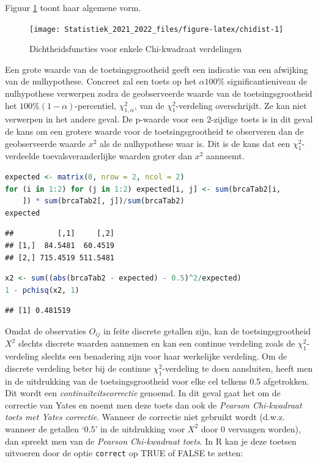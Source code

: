 \documentclass[
  12pt,dutch,coursenotes]{book}
\theoremstyle{definition}
\theoremstyle{definition}
\theoremstyle{definition}
\theoremstyle{definition}
\theoremstyle{remark}
\begin{document}
Figuur \ref{fig:chidist} toont haar algemene vorm.

\begin{figure}

{\centering \texttt{[image: Statistiek\_2021\_2022\_files/figure-latex/chidist-1]} 

}

\caption{Dichtheidsfuncties voor enkele Chi-kwadraat verdelingen}\label{fig:chidist}
\end{figure}

Een grote waarde van de toetsingsgrootheid geeft een indicatie van een
afwijking van de nulhypothese. Concreet zal een toets op het \(\alpha 100\%\)
significantieniveau de nulhypothese verwerpen zodra de geobserveerde waarde
van de toetsingsgrootheid het \(100\%(1-\alpha)\)-percentiel, \(\chi^2_{1, \alpha}\), van de \(\chi^2_1\)-verdeling overschrijdt. Ze kan niet verwerpen in
het andere geval. De p-waarde voor een 2-zijdige toets is in dit geval de
kans om een grotere waarde voor de toetsingsgrootheid te observeren dan de
geobserveerde waarde \(x^2\) als de nulhypothese waar is. Dit is de kans dat
een \(\chi^2_1\)-verdeelde toevalsveranderlijke waarden groter dan \(x^2\)
aanneemt.

\begin{lstlisting}[language=R]
expected <- matrix(0, nrow = 2, ncol = 2)
for (i in 1:2) for (j in 1:2) expected[i, j] <- sum(brcaTab2[i,
    ]) * sum(brcaTab2[, j])/sum(brcaTab2)
expected
\end{lstlisting}

\begin{lstlisting}
##          [,1]     [,2]
## [1,]  84.5481  60.4519
## [2,] 715.4519 511.5481
\end{lstlisting}

\begin{lstlisting}[language=R]
x2 <- sum((abs(brcaTab2 - expected) - 0.5)^2/expected)
1 - pchisq(x2, 1)
\end{lstlisting}

\begin{lstlisting}
## [1] 0.481519
\end{lstlisting}

Omdat de observaties \(O_{ij}\) in feite discrete getallen zijn, kan de
toetsingsgrootheid \(X^2\) slechts discrete waarden aannemen en kan een
continue verdeling zoals de \(\chi^2_1\)-verdeling slechts een benadering zijn
voor haar werkelijke verdeling. Om de discrete verdeling beter bij de
continue \(\chi^2_1\)-verdeling te doen aansluiten, heeft men in de
uitdrukking van de toetsingsgrootheid voor elke cel telkens 0.5 afgetrokken. Dit wordt een
\emph{continuïteitscorrectie} genoemd. In dit geval gaat het om de
correctie van Yates en noemt men deze toets dan ook de \emph{Pearson
Chi-kwadraat toets met Yates correctie}. Wanneer de correctie niet gebruikt
wordt (d.w.z. wanneer de getallen `0.5' in de uitdrukking voor \(X^2\) door 0
vervangen worden), dan spreekt men van de \emph{Pearson Chi-kwadraat toets}.
In R kan je deze toetsen uitvoeren door de optie \texttt{correct} op TRUE of FALSE te zetten:
\end{document}
